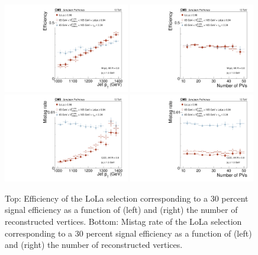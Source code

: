 \begin{figure}[htb]
\centering

\includegraphics[width=0.49\textwidth]{figures/vtagging/AN-18-099/validation/WtagSigEffvsjpt.pdf}
\includegraphics[width=0.49\textwidth]{figures/vtagging/AN-18-099/validation/WtagSigEffvsnPV.pdf}\\
\includegraphics[width=0.49\textwidth]{figures/vtagging/AN-18-099/validation/QCDMistagvsjpt.pdf}
\includegraphics[width=0.49\textwidth]{figures/vtagging/AN-18-099/validation/QCDMistagvsnPV.pdf}


\caption{Top: Efficiency of the LoLa selection corresponding to a 30 percent signal efficiency as a function of (left) \PT and (right) the number of reconstructed vertices. Bottom: Mistag rate of the LoLa selection corresponding to a 30 percent signal efficiency as a function of (left) \PT and (right) the number of reconstructed vertices.}
\label{fig:eff_val}
\end{figure}
\clearpage
